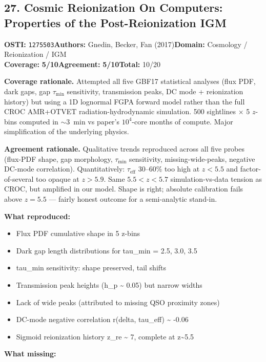 \documentclass[11pt]{article}
\newcommand{\scorebadge}[2]{\textbf{#1:} \textbf{#2/10}}
\begin{document}
\subsection{27. Cosmic Reionization On Computers: Properties of the Post-Reionization IGM}
\textbf{OSTI:} \texttt{1275503}\quad\textbf{Authors:} Gnedin, Becker, Fan (2017)\quad\textbf{Domain:} Cosmology / Reionization / IGM\\
\scorebadge{Coverage}{5}\quad\scorebadge{Agreement}{5}\quad\textbf{Total:} 10/20\par\smallskip
\noindent\textbf{Coverage rationale.} Attempted all five GBF17 statistical analyses (flux PDF, dark gaps, gap $\tau_\mathrm{min}$ sensitivity, transmission peaks, DC mode + reionization history) but using a 1D lognormal FGPA forward model rather than the full CROC AMR+OTVET radiation-hydrodynamic simulation. 500 sightlines $\times$ 5 $z$-bins computed in $\sim$3~min vs paper's $10^4$-core months of compute. Major simplification of the underlying physics.\par
\noindent\textbf{Agreement rationale.} Qualitative trends reproduced across all five probes (flux-PDF shape, gap morphology, $\tau_\mathrm{min}$ sensitivity, missing-wide-peaks, negative DC-mode correlation). Quantitatively: $\tau_\mathrm{eff}$ 30--60\% too high at $z<5.5$ and factor-of-several too opaque at $z>5.9$. Same $5.5<z<5.7$ simulation-vs-data tension as CROC, but amplified in our model. Shape is right; absolute calibration fails above $z=5.5$ --- fairly honest outcome for a semi-analytic stand-in.\par\smallskip
\noindent\textbf{What reproduced:}
\begin{itemize}[leftmargin=1.4em,itemsep=0.2em,topsep=0.2em]
\item Flux PDF cumulative shape in 5 z-bins
\item Dark gap length distributions for tau\_min = 2.5, 3.0, 3.5
\item tau\_min sensitivity: shape preserved, tail shifts
\item Transmission peak heights (h\_p \textasciitilde{} 0.05) but narrow widths
\item Lack of wide peaks (attributed to missing QSO proximity zones)
\item DC-mode negative correlation r(delta, tau\_eff) \textasciitilde{} -0.06
\item Sigmoid reionization history z\_re \textasciitilde{} 7, complete at z\textasciitilde{}5.5
\end{itemize}\noindent\textbf{What missing:}
\end{document}
